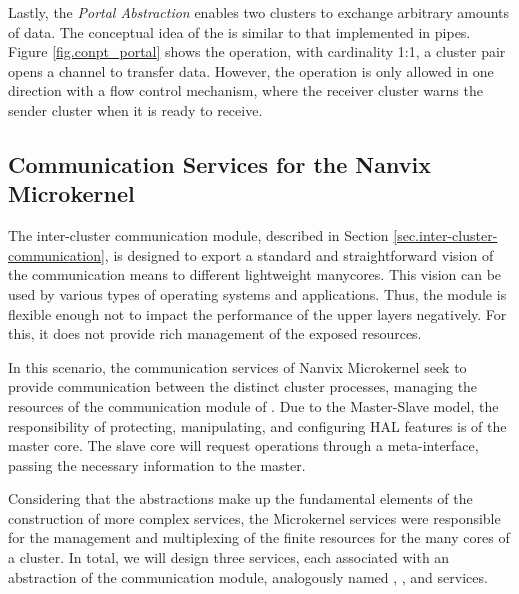 				Lastly, the \textit{Portal Abstraction} enables two clusters to exchange arbitrary
				amounts of data.
				The conceptual idea of the \portal is similar to that implemented in \posix pipes.
				Figure \ref{fig.conpt_portal} shows the \portal operation, with cardinality
				1:1, a cluster pair opens a channel to transfer data.
				However, the operation is only allowed in one direction with a flow control mechanism,
				where the receiver cluster warns the sender cluster when it is ready to receive.
		
	\subsection{Communication Services for the Nanvix Microkernel}
	
		The inter-cluster communication module, described in Section \ref{sec.inter-cluster-communication},
		is designed to export a standard and straightforward vision of
		the communication means to different lightweight manycores.
		This vision can be used by various types of operating systems
		and applications.
		Thus, the module is flexible enough not to impact the performance
		of the upper layers negatively.
		For this, it does not provide rich management of the exposed resources.

		In this scenario, the communication services of Nanvix Microkernel seek
		to provide communication between the distinct cluster processes, managing
		the resources of the communication module of \hal.
		Due to the Master-Slave model, the responsibility of protecting,
		manipulating, and configuring HAL features is of the master core.
		The slave core will request operations through a meta-interface,
		passing the necessary information to the master.

		Considering that the abstractions make up the fundamental elements of
		the construction of more complex services, the Microkernel services
		were responsible for the management and multiplexing of the finite
		resources for the many cores of a cluster.
		In total, we will design three services, each associated with an
		abstraction of the communication module, analogously named \sync,
		\mailbox, and \portal services.


